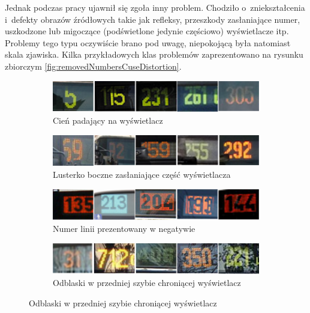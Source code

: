 Jednak podczas pracy ujawnił się zgoła inny problem.
Chodziło o~zniekształcenia i~defekty obrazów źródłowych takie
jak refleksy, przeszkody zasłaniające numer, uszkodzone lub migoczące
(podświetlone jedynie częściowo) wyświetlacze itp.
Problemy tego typu oczywiście brano pod uwagę, niepokojącą
była natomiast skala zjawiska.
Kilka przykładowych klas problemów zaprezentowano na rysunku
zbiorczym \ref{fig:removedNumbersCuseDistortion}.

\begin{figure}[h!]\centering
	\begin{subfigure}{.6\linewidth}\centering
		\centering
		\includegraphics[width=1\textwidth]{img/usunieteNumery/cien}
		\caption{Cień padający na wyświetlacz}
	\end{subfigure}
	\hfill	
	\begin{subfigure}{.60\linewidth}\centering
		\centering
		\includegraphics[width=1\textwidth]{img/usunieteNumery/lusterko}
		\caption{Lusterko boczne
			zasłaniające część wyświetlacza}
	\end{subfigure}
	\hfill	
	\begin{subfigure}{.60\linewidth}\centering
		\centering
		\includegraphics[width=1\textwidth]{img/usunieteNumery/negatyw}
		\caption{Numer linii prezentowany w negatywie}
	\end{subfigure}
	\hfill	
	\begin{subfigure}{.60\linewidth}\centering
		\centering
		\includegraphics[width=1\textwidth]{img/usunieteNumery/odblask}
		\caption{Odblaski w przedniej szybie chroniącej wyświetlacz}

\end{subfigure}
\end{figure}
